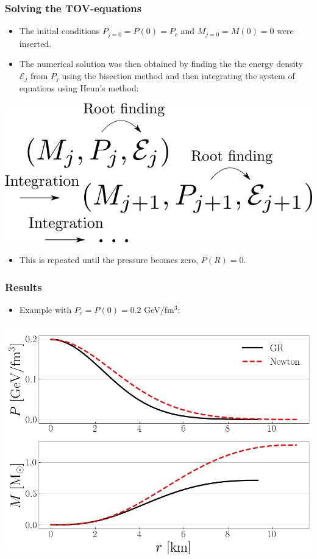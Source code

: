 \documentclass{beamer}
\begin{document}
\begin{frame}
\frametitle{Solving the TOV-equations}
\begin{itemize}
    \item The initial conditions $P_{j=0} = P(0) = P_c$ and $M_{j=0} = M(0) = 0$ were inserted.
    \item The numerical solution was then obtained by finding the the energy density $\mathcal{E}_j$ from $P_j$ using the bisection method and then integrating the system of equations using Heun's method:
\end{itemize}
\begin{center}
    \includegraphics[scale=0.35]{Numerical_scheme.png}
\end{center}
\begin{itemize}
    \item This is repeated until the pressure beomes zero, $P(R) = 0$.
\end{itemize}
\end{frame}

\begin{frame}
\frametitle{Results}
\begin{itemize}
    \item Example with $P_c = P(0) = 0.2$ GeV/fm$^3$:
\end{itemize}
\begin{center}
    \includegraphics[scale=0.4]{Newt.png}
\end{center}
\end{frame}
\end{document}
